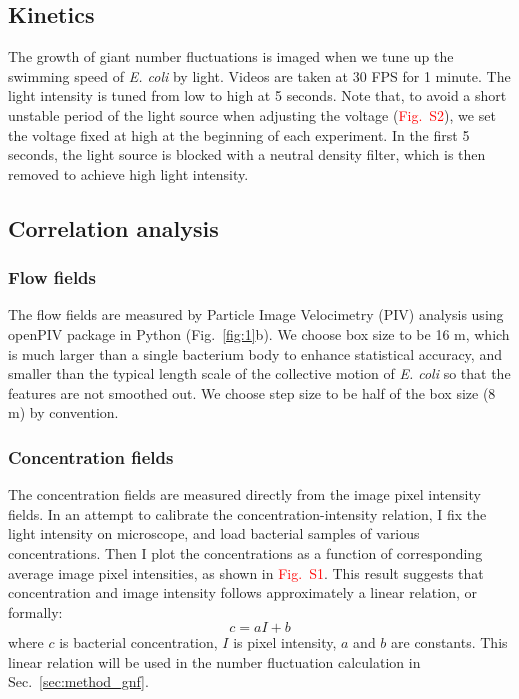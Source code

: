 \documentclass[twocolumn,aps,pre,amsmath,amssymb,longbibliography]{revtex4-1}
\begin{document}
\subsection{Kinetics}
The growth of giant number fluctuations is imaged when we tune up the swimming speed of \textit{E. coli} by light. Videos are taken at 30 FPS for 1 minute. The light intensity is tuned from low to high at 5 seconds. Note that, to avoid a short unstable period of the light source when adjusting the voltage (\textcolor{red}{Fig.~S2}), we set the voltage fixed at high at the beginning of each experiment. In the first 5 seconds, the light source is blocked with a neutral density filter, which is then removed to achieve high light intensity.





\subsection{Correlation analysis}

\subsubsection{Flow fields}
The flow fields are measured by Particle Image Velocimetry (PIV) analysis using openPIV package in Python \cite{openpiv} (Fig.~\ref{fig:1}b). We choose box size to be 16 \textmu m, which is much larger than a single bacterium body to enhance statistical accuracy, and smaller than the typical length scale of the collective motion of \textit{E. coli} so that the features are not smoothed out. We choose step size to be half of the box size (8 \textmu m) by convention.

\subsubsection{Concentration fields}
The concentration fields are measured directly from the image pixel intensity fields. In an attempt to calibrate the concentration-intensity relation, I fix the light intensity on microscope, and load bacterial samples of various concentrations. Then I plot the concentrations as a function of corresponding average image pixel intensities, as shown in \textcolor{red}{Fig.~S1}. This result suggests that concentration and image intensity follows approximately a linear relation, or formally:
$$ c = aI + b $$
where $c$ is bacterial concentration, $I$ is pixel intensity, $a$ and $b$ are constants. This linear relation will be used in the number fluctuation calculation in Sec.~\ref{sec:method_gnf}.
\end{document}
